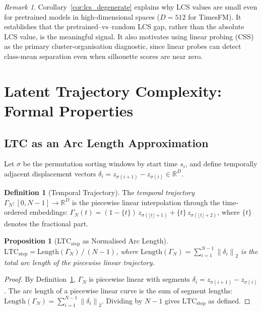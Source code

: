 \documentclass[12pt]{article}
\newtheorem{proposition}[theorem]{Proposition}
\theoremstyle{definition}
\newtheorem{definition}[theorem]{Definition}
\theoremstyle{remark}
\newtheorem{remark}[theorem]{Remark}
\newcommand{\R}{\mathbb{R}}
\newcommand{\norm}[1]{\left\lVert #1 \right\rVert}
\newcommand{\ltcstep}{\mathrm{LTC}_{\mathrm{step}}}
\begin{document}
\begin{remark}
Corollary~\ref{cor:lcs_degenerate} explains why LCS values are small even
for pretrained models in high-dimensional spaces ($D = 512$ for TimesFM).
It establishes that the pretrained--vs--random LCS gap, rather than the
absolute LCS value, is the meaningful signal. It also motivates using linear
probing (CSS) as the primary cluster-organisation diagnostic, since linear
probes can detect class-mean separation even when silhouette scores are near
zero.
\end{remark}

\section{Latent Trajectory Complexity: Formal Properties}
\label{sec:ltc_theory}

\subsection{LTC as an Arc Length Approximation}

Let $\sigma$ be the permutation sorting windows by start time $s_i$, and
define temporally adjacent displacement vectors
$\delta_i = z_{\sigma(i+1)} - z_{\sigma(i)} \in \R^D$.

\begin{definition}[Temporal Trajectory]
\label{def:trajectory}
The \emph{temporal trajectory} $\Gamma_N : [0, N-1] \to \R^D$ is the
piecewise linear interpolation through the time-ordered embeddings:
$\Gamma_N(t) = (1 - \{t\})\,z_{\sigma(\lfloor t\rfloor + 1)} +
\{t\}\,z_{\sigma(\lfloor t\rfloor + 2)}$, where $\{t\}$ denotes the
fractional part.
\end{definition}

\begin{proposition}[LTC$_{\mathrm{step}}$ as Normalised Arc Length]
\label{prop:ltc_arclength}
$\ltcstep = \mathrm{Length}(\Gamma_N)\,/\,(N-1)$, where
$\mathrm{Length}(\Gamma_N) = \sum_{i=1}^{N-1}\norm{\delta_i}_2$ is the
total arc length of the piecewise linear trajectory.
\end{proposition}

\begin{proof}
By Definition~\ref{def:trajectory}, $\Gamma_N$ is piecewise linear with
segments $\delta_i = z_{\sigma(i+1)} - z_{\sigma(i)}$. The arc length of a
piecewise linear curve is the sum of segment lengths:
$\mathrm{Length}(\Gamma_N) = \sum_{i=1}^{N-1}\norm{\delta_i}_2$.
Dividing by $N-1$ gives $\ltcstep$ as defined.
\end{proof}
\end{document}
